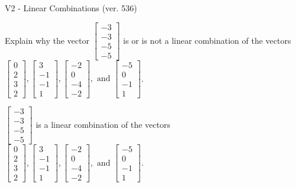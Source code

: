 \begin{exercise}
  \begin{exerciseTitle}V2 - Linear Combinations (ver. 536)\end{exerciseTitle}
  \begin{exerciseStatement}
    Explain why the vector \(\left[\begin{array}{c}
-3 \\
-3 \\
-5 \\
-5
\end{array}\right]\)  is or is not a linear 
	combination of the vectors \(\left[\begin{array}{c}
0 \\
2 \\
3 \\
2
\end{array}\right] , \left[\begin{array}{c}
3 \\
-1 \\
-1 \\
1
\end{array}\right] , \left[\begin{array}{c}
-2 \\
0 \\
-4 \\
-2
\end{array}\right] , \text{ and } \left[\begin{array}{c}
-5 \\
0 \\
-1 \\
1
\end{array}\right]\).
	


  \end{exerciseStatement}
  \begin{exerciseAnswer}
   \(\left[\begin{array}{c}
-3 \\
-3 \\
-5 \\
-5
\end{array}\right]\) 
  	 is  
	a linear combination of the vectors \(\left[\begin{array}{c}
0 \\
2 \\
3 \\
2
\end{array}\right] , \left[\begin{array}{c}
3 \\
-1 \\
-1 \\
1
\end{array}\right] , \left[\begin{array}{c}
-2 \\
0 \\
-4 \\
-2
\end{array}\right] , \text{ and } \left[\begin{array}{c}
-5 \\
0 \\
-1 \\
1
\end{array}\right]\).


\end{exerciseAnswer}
\end{exercise}
